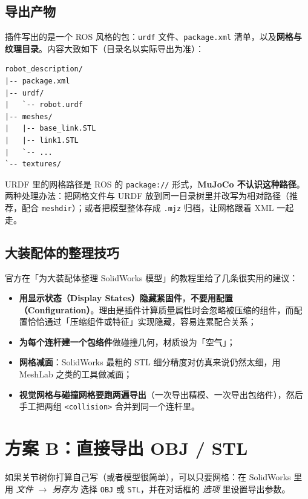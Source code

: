 \subsection{导出产物}

插件写出的是一个 ROS 风格的包：\texttt{urdf} 文件、\texttt{package.xml} 清单，以及\textbf{网格与纹理目录}。内容大致如下（目录名以实际导出为准）：

\begin{lstlisting}[style=code]
robot_description/
|-- package.xml
|-- urdf/
|   `-- robot.urdf
|-- meshes/
|   |-- base_link.STL
|   |-- link1.STL
|   `-- ...
`-- textures/
\end{lstlisting}

\begin{warnbox}[路径必须改]
	URDF 里的网格路径是 ROS 的 \texttt{package://} 形式，\textbf{MuJoCo 不认识这种路径}。
	两种处理办法：把网格文件与 URDF 放到同一目录树里并改写为相对路径（推荐，配合 \texttt{meshdir}）；或者把模型整体存成 \texttt{.mjz} 归档，让网格跟着 XML 一起走。
\end{warnbox}

\subsection{大装配体的整理技巧}

官方在「为大装配体整理 SolidWorks 模型」的教程里给了几条很实用的建议：

\begin{itemize}
	\item \textbf{用显示状态（Display States）隐藏紧固件}，\textbf{不要用配置（Configuration）}。理由是插件计算质量属性时会忽略被压缩的组件，而配置恰恰通过「压缩组件或特征」实现隐藏，容易连累配合关系；
	\item \textbf{为每个连杆建一个包络件}做碰撞几何，材质设为「空气」；
	\item \textbf{网格减面}：SolidWorks 最粗的 STL 细分精度对仿真来说仍然太细，用 MeshLab 之类的工具做减面；
	\item \textbf{视觉网格与碰撞网格要跑两遍导出}（一次导出精模、一次导出包络件），然后手工把两组 \texttt{<collision>} 合并到同一个连杆里。
\end{itemize}

\section{方案 B：直接导出 OBJ / STL}

如果关节树你打算自己写（或者模型很简单），可以只要网格：在 SolidWorks 里用 \textit{文件 $\rightarrow$ 另存为} 选择 \texttt{OBJ} 或 \texttt{STL}，并在对话框的 \textit{选项} 里设置导出参数。

